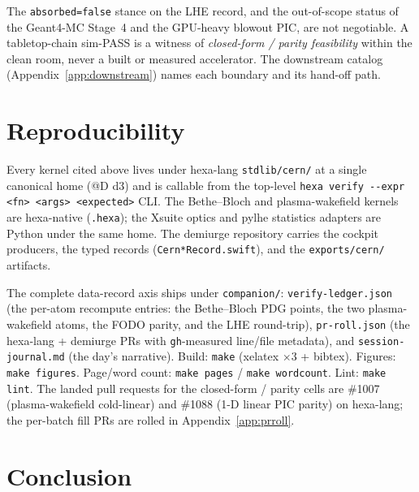 \documentclass[11pt,a4paper]{article}
\begin{document}
\noindent
The \texttt{absorbed=false} stance on the LHE record, and the
out-of-scope status of the Geant4-MC Stage~4 and the GPU-heavy blowout
PIC, are not negotiable. A tabletop-chain sim-PASS is a witness of
\emph{closed-form / parity feasibility} within the clean room, never a
built or measured accelerator. The downstream catalog
(Appendix~\ref{app:downstream}) names each boundary and its hand-off
path.

\section{Reproducibility}
\label{sec:repro}

Every kernel cited above lives under hexa-lang \verb|stdlib/cern/| at a
single canonical home (@D d3) and is callable from the top-level
\verb|hexa verify --expr <fn> <args> <expected>| CLI. The Bethe--Bloch
and plasma-wakefield kernels are hexa-native (\verb|.hexa|); the Xsuite
optics and pylhe statistics adapters are Python under the same home. The
demiurge repository carries the cockpit producers, the typed records
(\texttt{Cern*Record.swift}), and the \verb|exports/cern/| artifacts.

\smallskip\noindent
The complete data-record axis ships under \texttt{companion/}:
\texttt{verify-ledger.json} (the per-atom recompute entries: the
Bethe--Bloch PDG points, the two plasma-wakefield atoms, the FODO
parity, and the LHE round-trip),
\texttt{pr-roll.json} (the hexa-lang + demiurge PRs with
\texttt{gh}-measured line/file metadata), and
\texttt{session-journal.md} (the day's narrative). Build:
\texttt{make} (xelatex $\times 3$ + bibtex). Figures:
\texttt{make figures}. Page/word count: \texttt{make pages} /
\texttt{make wordcount}. Lint: \texttt{make lint}.
The landed pull requests for the closed-form / parity cells are
\#1007 (plasma-wakefield cold-linear) and \#1088 (1-D linear PIC
parity) on hexa-lang; the per-batch fill PRs are rolled in
Appendix~\ref{app:prroll}.

\section{Conclusion}
\label{sec:conclusion}
\end{document}
